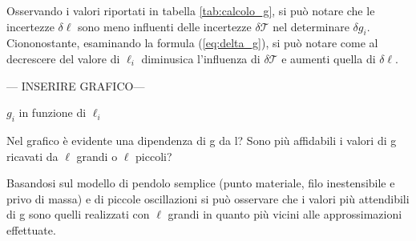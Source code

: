 Osservando i valori riportati in tabella \ref{tab:calcolo_g}, si può notare che le incertezze $\delta\ell$ sono meno influenti delle incertezze $\delta\mathcal{T}$ nel determinare $\delta g_i$. Ciononostante, esaminando la formula (\ref{eq:delta_g}), si può notare come al decrescere del valore di $\ell_i$ diminusica l'influenza di $\delta\mathcal{T}$ e aumenti quella di $\delta\ell$.

\begin{center}
--- INSERIRE GRAFICO---

$g_i$ in funzione di $\ell_i$
\end{center}

Nel grafico è evidente una dipendenza di g da l? Sono più affidabili i valori di g ricavati da $\ell$ grandi o $\ell$ piccoli?

Basandosi sul modello di pendolo semplice (punto materiale, filo inestensibile e privo di massa) e di piccole oscillazioni si può osservare che i valori più attendibili di g sono quelli realizzati con $\ell$ grandi in quanto più vicini alle approssimazioni effettuate.